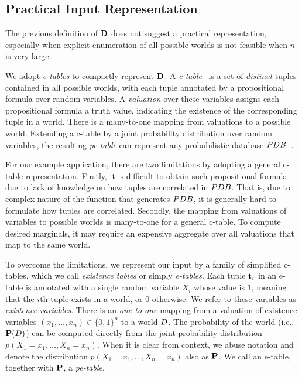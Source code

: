 \subsection{Practical Input Representation}
\label{sec:outputrepresentation}
The previous definition of $\mathbf{D}$ does not suggest a practical representation, especially when explicit enumeration of all possible worlds is not feasible when $n$ is very large.

We adopt \emph{c-tables} to compactly represent $\mathbf{D}$. 
A \emph{c-table}~\cite{suciu2009probabilistic} is a set of \emph{distinct} tuples contained in all possible worlds, with each tuple annotated by a propositional formula over random variables.
A \emph{valuation} over these variables assigns each propositional formula a truth value, indicating the existence of the corresponding tuple in a world.
There is a many-to-one mapping from valuations to a possible world.
Extending a c-table by a joint probability distribution over random variables, the resulting \emph{pc-table} can represent any probabilistic database $PDB$~\cite{suciu2009probabilistic}.

For our example application, there are two limitations by adopting a general c-table representation.
Firstly, it is difficult to obtain such propositional formula due to lack of knowledge on how tuples are correlated in $PDB$.
That is, due to complex nature of the function that generates $PDB$, it is generally hard to formulate how tuples are correlated.
Secondly, the mapping from valuations of variables to possible worlds is many-to-one for a general c-table.
To compute desired marginals, it may require an expensive aggregate over all valuations that map to the same world. 

To overcome the limitations, we represent our input by a family of simplified c-tables, which we call \emph{existence tables} or simply \emph{e-tables}.
Each tuple $\mathbf{t}_i$ in an e-table is annotated with a single random variable $X_i$ whose value is $1$, meaning that the $i$th tuple exists in a world, or $0$ otherwise.
We refer to these variables as \emph{existence variables}.
There is an \emph{one-to-one} mapping from a valuation of existence variables $(x_1,\ldots,x_n)\in\{0,1\}^n$ to a world $D$.
The probability of the world (i.e., $\mathbf{P}(D)$) can be computed directly from the joint probability distribution $p(X_1=x_1,\ldots,X_n=x_n)$.
When it is clear from context, we abuse notation and denote the distribution $p(X_1=x_1,\ldots,X_n=x_n)$ also as $\mathbf{P}$.
We call an e-table, together with $\mathbf{P}$, a \emph{pe-table}. 

